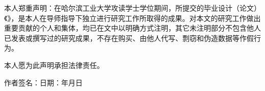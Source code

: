 
\BiAuthorization

本人郑重声明：在哈尔滨工业大学攻读学士学位期间，所提交的毕业设计（论文）《\chinesethesistitle》，是本人在导师指导下独立进行研究工作所取得的成果。对本文的研究工作做出重要贡献的个人和集体，均已在文中以明确方式注明，其它未注明部分不包含他人已发表或撰写过的研究成果，不存在购买、由他人代写、剽窃和伪造数据等作假行为。

本人愿为此声明承担法律责任。

\vspace{\baselineskip}
\hspace{6em}作者签名：\hfill 日期：\hspace{2.5em}年\hspace{1.5em}月\hspace{1.5em}日
